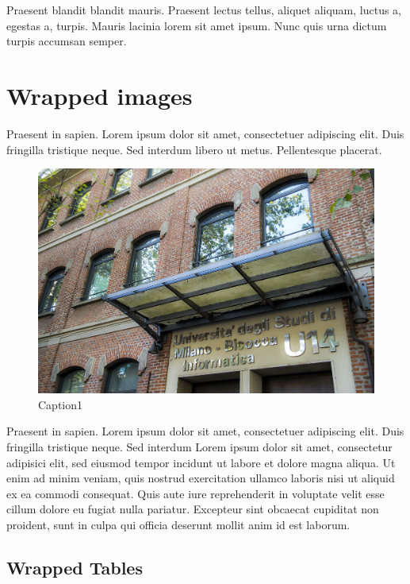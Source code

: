 \documentclass[a4paper, oneside]{book}
\begin{document}
Praesent blandit blandit mauris. Praesent lectus tellus, aliquet aliquam, luctus a, egestas a, turpis. Mauris lacinia lorem sit amet ipsum. Nunc quis urna dictum turpis accumsan semper.

\section{Wrapped images}

Praesent in sapien. Lorem ipsum dolor sit amet, consectetuer 
adipiscing elit. Duis fringilla tristique neque. Sed interdum 
libero ut metus. Pellentesque placerat.

\begin{figure}
\includegraphics[width=0.9\linewidth]{u14} 
\caption{Caption1}
\label{fig:wrapfig}
\end{figure}

Praesent in sapien. Lorem ipsum dolor sit amet, consectetuer 
adipiscing elit. Duis fringilla tristique neque. Sed interdum
Lorem ipsum dolor sit amet, consectetur adipisici elit, sed eiusmod tempor incidunt ut labore et dolore magna aliqua. Ut enim ad minim veniam, quis nostrud exercitation ullamco laboris nisi ut aliquid ex ea commodi consequat. Quis aute iure reprehenderit in voluptate velit esse cillum dolore eu fugiat nulla pariatur. Excepteur sint obcaecat cupiditat non proident, sunt in culpa qui officia deserunt mollit anim id est laborum.
 
\subsection{Wrapped Tables}
 
\end{document}
